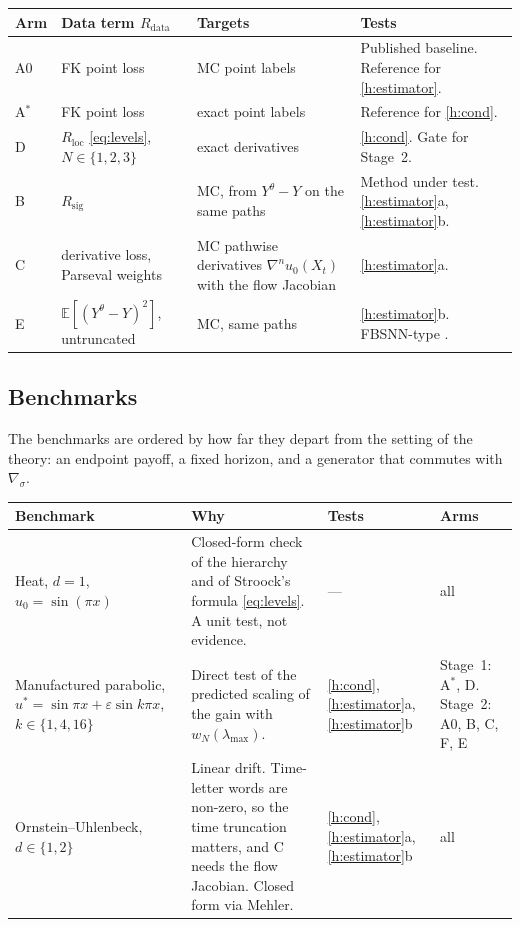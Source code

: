 \documentclass[english]{article}
\begin{document}
\begin{center}
\small
\renewcommand{\arraystretch}{1.15}
\begin{tabularx}{\textwidth}{@{}l >{\raggedright\arraybackslash}p{3.5cm} >{\raggedright\arraybackslash}p{4.6cm} >{\raggedright\arraybackslash}X@{}}
\toprule
Arm & Data term $R_\mathrm{data}$ & Targets & Tests \\
\midrule
A0 & FK point loss & MC point labels & Published baseline. Reference for \ref{h:estimator}. \\
A$^*$ & FK point loss & exact point labels & Reference for \ref{h:cond}. \\
D & $R_\mathrm{loc}$ \eqref{eq:levels}, $N\in\{1,2,3\}$ & exact derivatives & \ref{h:cond}. Gate for Stage~2. \\
B & $R_\mathrm{sig}$ & MC, from $Y^\theta - Y$ on the same paths & Method under test. \ref{h:estimator}a, \ref{h:estimator}b. \\
C & derivative loss, Parseval weights & MC pathwise derivatives $\nabla^n u_0(X_t)$ with the flow Jacobian & \ref{h:estimator}a. \\
E & $\mathbb E[(Y^\theta - Y)^2]$, untruncated & MC, same paths & \ref{h:estimator}b. FBSNN-type \cite{raissi2018fbsnn}. \\
\bottomrule
\end{tabularx}
\end{center}

\subsection{Benchmarks}

The benchmarks are ordered by how far they depart from the setting of the
theory: an endpoint payoff, a fixed horizon, and a generator that commutes with
$\nabla_\sigma$.

\begin{center}
\small
\renewcommand{\arraystretch}{1.15}
\begin{tabularx}{\textwidth}{@{}>{\raggedright\arraybackslash}p{4.2cm} >{\raggedright\arraybackslash}X >{\raggedright\arraybackslash}p{1.6cm} >{\raggedright\arraybackslash}p{2.2cm}@{}}
\toprule
Benchmark & Why & Tests & Arms \\
\midrule
Heat, $d=1$, $u_0=\sin(\pi x)$ & Closed-form check of the hierarchy and of Stroock's formula \eqref{eq:levels}. A unit test, not evidence. & --- & all \\
Manufactured parabolic, $u^*=\sin\pi x+\varepsilon\sin k\pi x$, $k\in\{1,4,16\}$ & Direct test of the predicted scaling of the gain with $w_N(\lambda_{\max})$. & \ref{h:cond}, \ref{h:estimator}a, \ref{h:estimator}b & Stage~1: A$^*$, D. Stage~2: A0, B, C, F, E \\
Ornstein--Uhlenbeck, $d\in\{1,2\}$ & Linear drift. Time-letter words are non-zero, so the time truncation matters, and C needs the flow Jacobian. Closed form via Mehler. & \ref{h:cond}, \ref{h:estimator}a, \ref{h:estimator}b & all \\
\bottomrule
\end{tabularx}
\end{center}
\end{document}
